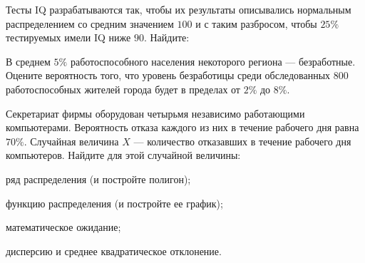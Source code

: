 \vfil

\begin{zkrPlain}{25}\noindent 
	Тесты IQ разрабатываются так, чтобы их результаты описывались нормальным распределением со средним значением $100$ и с таким разбросом, чтобы $25\%$ тестируемых имели IQ ниже $90$. Найдите: \par {}
 
\end{zkrPlain}

\vfil

\begin{zkrPlain}{25}\noindent 
	В среднем $ 5 \% $ работоспособного населения некоторого региона --- безработные. Оцените вероятность того, что уровень безработицы среди обследованных $ 800 $ работоспособных жителей города будет в пределах от $ 2 \% $ до $ 8 \% $.
 
\end{zkrPlain}

\newpage\setcounter{zad}{0}\setcounter{footnote}{0}



\begin{zkrPlain}{25}\noindent 
	Секретариат фирмы оборудован четырьмя независимо работающими компьютерами. Вероятность отказа каждого из них в течение рабочего дня равна $70\%$. Случайная величина $X$ --- количество отказавших в течение рабочего дня компьютеров.  Найдите для этой случайной величины: \par \smallskip\small{ \par \zz ряд распределения (и постройте полигон); \par \zz функцию распределения (и постройте ее график); \par \zz математическое ожидание; \par \zz дисперсию и среднее квадратическое отклонение.\par \par}
 
\end{zkrPlain}

\vfil

